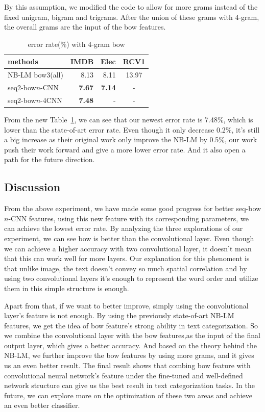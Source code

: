 By this assumption, we modified the code to allow for more grams instead of the fixed unigram, bigram and trigrams. After the union
of these grams with 4-gram, the overall grams are the input of the bow features.

\begin{table}
\begin{tabular}{|l|r|r|c|}
\hline \bf methods & \bf IMDB & \bf Elec & \bf RCV1 \\ \hline
NB-LM bow3(all) & 8.13 & 8.11 & 13.97 \\
\hline seq2-bow$n$-CNN & \textbf{7.67} & \textbf{7.14} & - \\
\hline seq2-bow$n$-4CNN & \textbf{7.48} & - & - \\
\hline
\end{tabular}
\caption{\label{bow4-table} error rate(\%) with 4-gram bow}
\end{table} 

From the new Table~\ref{bow4-table}, we can see that our newest error rate is 7.48\%, which is lower than the state-of-art error rate. Even though
it only decrease 0.2\%, it's still a big increase as their original work only improve the NB-LM by 0.5\%, our work push their work
forward and give a more lower error rate. And it also open a path for the future direction.


\subsection{Discussion}

From the above experiment, we have made some good progress for better seq-bow$n$-CNN features, using this new feature with its corresponding parameters, we can achieve the lowest error rate. By analyzing the three explorations of our experiment, we can see bow is better than the
convolutional layer. Even though we can achieve a higher accuracy with two convolutional layer, it doesn't mean that this can work well for
more layers. Our explanation for this phenoment is that unlike image, the text doesn't convey so much spatial correlation and by using two
convolutional layers it's enough to represent the word order and utilize them in this simple structure is enough.

Apart from that, if we want to better improve, simply using the convolutional layer's feature is not enough. By using the previously state-of-art
NB-LM features, we get the idea of bow feature's strong ability in text categorization. So we combine the convolutional layer with the bow features,as the input of the final output layer, which gives a better accuracy. And based on the theory behind the NB-LM, we further improve the
bow features by using more grams, and it gives us an even better result. The final result shows that combing bow feature with convolutional neural
network's feature under the fine-tuned and well-defined network structure can give us the best result in text categorization tasks. In the future,
we can explore more on the optimization of these two areas and achieve an even better classifier.

